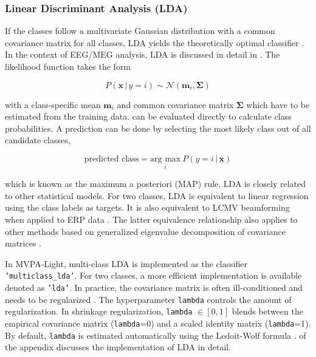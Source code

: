 \documentclass[utf8]{frontiersSCNS} %
\newcommand{\m}{\mathbf{m}}
\newcommand{\x}{\mathbf{x}}
\newcommand{\ttt}[1]{\texttt{#1}}
\begin{document}
\subsubsection{Linear Discriminant Analysis (LDA)}\label{sec:lda}

If the classes follow a multivariate Gaussian distribution with a common covariance matrix for all classes, LDA yields the theoretically optimal classifier \citep{Duda1998}. In the context of EEG/MEG analysis, LDA is discussed in detail in \cite{Blankertz2011}. The likelihood function takes the form

\begin{equation}
\label{eq:lda_likelihood}
P(\x\,|\,y = i) \sim \mathcal{N}(\m_i, \mathbf{\Sigma})
\end{equation}

with a class-specific mean $\m_i$ and common covariance matrix $\mathbf{\Sigma}$ which have to be  estimated from the training data.  can be evaluated directly to calculate class probabilities. A prediction can be done by selecting the most likely class out of all candidate classes,

\begin{equation*}
\text{predicted class} = \underset{i}{\text{arg max}}\ P(y = i\,|\,\x)
\end{equation*}

which is known as the maximum a posteriori (MAP) rule. LDA is closely related to other statistical models. For two classes, LDA is equivalent to linear regression using the class labels as targets. It is also equivalent to LCMV beamforming when applied to ERP data \citep{Treder2016}. The latter equivalence relationship also applies to other methods based on generalized eigenvalue decomposition of covariance matrices \citep{DeCheveigne2014JointAnalysis}.

In MVPA-Light, multi-class LDA is implemented as the classifier  \texttt{'multiclass\_lda'}. For two classes, a more efficient implementation is available denoted as  \ttt{'lda'}. In practice, the covariance matrix is often ill-conditioned and needs to be regularized \citep{Blankertz2011}. The hyperparameter \ttt{lambda} controls the amount of regularization. In shrinkage regularization,  \ttt{lambda} $\in [0,1]$ blends between the empirical covariance matrix (\ttt{lambda}=0) and a scaled identity matrix (\ttt{lambda}=1). By default, \ttt{lambda} is estimated automatically using the Ledoit-Wolf formula \citep{Ledoit2003HoneyMatrix,Blankertz2011}.  of the appendix discusses the implementation of LDA in detail.
\end{document}
